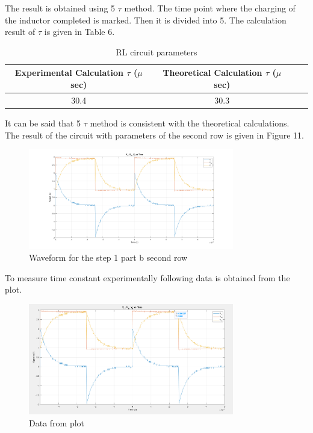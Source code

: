 \documentclass[letterpaper,12pt]{article}
\begin{document}
The result is obtained using 5 \(\tau\) method. The time point where the charging of the inductor completed is marked. Then it is divided into 5. The calculation result of \(\tau\) is given in Table 6.
\begin{table}[H]
	\begin{center}
	\caption{RL circuit parameters}
	\vspace{2mm}
		\begin{tabular}{||c | c | c | c||} 
		 \hline
		 Experimental Calculation \(\tau\) (\(\mu\) sec) & Theoretical Calculation \(\tau\) (\(\mu\) sec) \\ [0.5ex] 
		 \hline\hline
		 30.4 & 30.3 \\ 
		 \hline
	\end{tabular}
	\end{center}
	\end{table}
It can be said that 5 \(\tau\) method is consistent with the theoretical calculations. \\

The result of the circuit with parameters of the second row is given in Figure 11.

\begin{figure}[H]
	\centering
   \includegraphics[width=0.8\textwidth]{1b_2.png}
   \caption{Waveform for the step 1 part b second row}
\end{figure} 
To measure time constant experimentally following data is obtained from the plot.
\begin{figure}[H]
	\centering
   \includegraphics[width=0.8\textwidth]{1_b_2_plot_data.png}
   \caption{Data from plot}
\end{figure} 
\end{document}
